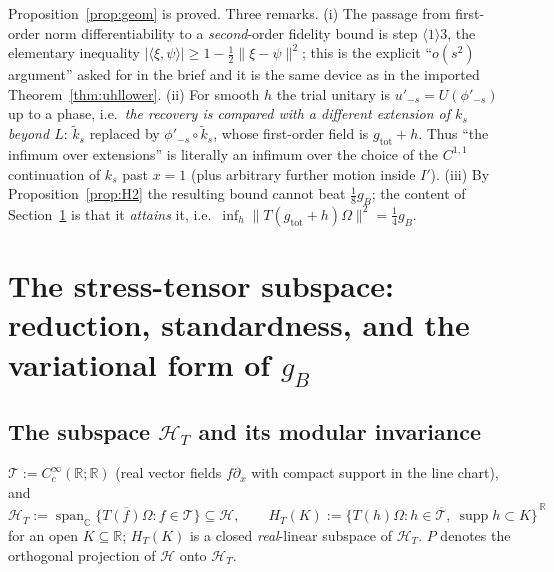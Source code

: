 \documentclass[11pt]{article}
\newcommand{\Om}{\Omega}
\newcommand{\Hil}{\mathcal H}
\newcommand{\ip}[2]{\langle#1,#2\rangle}
\newcommand{\norm}[1]{\lVert#1\rVert}
\newcommand{\gB}{g_B}
\newcommand{\HT}{\Hil_T}
\newcommand{\HTR}{H_T}
\newcommand{\kt}{\widetilde k}
\newcommand{\gtot}{g_{\mathrm{tot}}}
\newcommand{\supp}{\operatorname{supp}}
\begin{document}
\begin{verdictok}
Proposition~\ref{prop:geom} is proved.  Three remarks.  (i) The passage from first-order norm
differentiability to a \emph{second}-order fidelity bound is step $\langle1\rangle3$, the elementary
inequality $|\ip\xi\psi|\ge1-\frac12\norm{\xi-\psi}^2$; this is the explicit ``$o(s^2)$ argument'' asked for
in the brief and it is the same device as in the imported Theorem~\ref{thm:uhllower}.
(ii) For smooth $h$ the trial unitary is $u'_{-s}=U(\phi'_{-s})$ up to a phase, i.e.\ \emph{the recovery is compared with a different
extension of $k_s$ beyond $L$}: $\kt_s$ replaced by $\phi'_{-s}\circ\kt_s$, whose first-order field is
$\gtot+h$.  Thus ``the infimum over extensions'' is literally an infimum over the choice of the
$C^{1,1}$ continuation of $k_s$ past $x=1$ (plus arbitrary further motion inside $I'$).
(iii) By Proposition~\ref{prop:H2} the resulting bound cannot beat $\frac18\gB$; the content of
Section~\ref{sec:standard} is that it \emph{attains} it, i.e.\ $\inf_h\norm{T(\gtot+h)\Om}^2=\frac14\gB$.
\end{verdictok}

\section{The stress-tensor subspace: reduction, standardness, and the variational form of $\gB$}
\label{sec:standard}

\subsection{The subspace $\HT$ and its modular invariance}

\begin{definition}\label{def:HT}
$\mathcal T:=C^\infty_c(\mathbb R;\mathbb R)$ (real vector fields $f\partial_x$ with compact support in the line
chart), and
\begin{equation}\label{eq:HT}
 \HT:=\overline{\operatorname{span}_{\mathbb C}\{T(f)\Om:f\in\mathcal T\}}\subseteq\Hil,\qquad
 \HTR(K):=\overline{\{T(h)\Om:h\in\mathcal T,\ \supp h\subset K\}}^{\,\mathbb R}
\end{equation}
for an open $K\subseteq\mathbb R$; $\HTR(K)$ is a closed \emph{real}-linear subspace of $\HT$.  $P$ denotes the
orthogonal projection of $\Hil$ onto $\HT$.
\end{definition}
\end{document}
